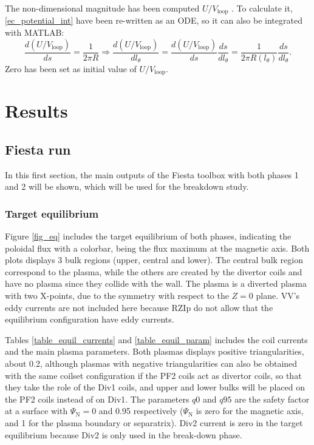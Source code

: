 \documentclass[a4paper,12pt,oneside]{book}
\begin{document}
The non-dimensional magnitude has been computed $U/V_\text{loop}$ \cite{Lazarus_1998}. To calculate it, \eqref{ec_potential_int} have been re-written as an ODE, so it can also be integrated with MATLAB:
%
\begin{equation}
\dfrac{d(U/V_\text{loop})}{ds}= \dfrac{1}{2 \pi R} \Rightarrow \dfrac{d(U/V_\text{loop})}{d l_\theta }=\dfrac{d(U/V_\text{loop})}{ds} \dfrac{ds}{d l_\theta}= \dfrac{1}{2 \pi R(l_\theta)} \dfrac{ds}{d l_\theta} .
\end{equation}
Zero has been set as initial value of $U/V_\text{loop}$.



\chapter{Results}
\label{sec_results}
\section{Fiesta run}

In this first section, the main outputs of the Fiesta toolbox with both phases 1 and 2 will be shown, which will be used for the breakdown study.

\subsection{Target equilibrium}

Figure \ref{fig_eq} includes the target equilibrium of both phases, indicating the poloidal flux with a colorbar, being the flux maximum at the magnetic axis. Both plots displays 3 bulk regions (upper, central and lower). The central bulk region correspond to the plasma, while the others are created by the divertor coils and have no plasma since they collide with the wall. The plasma is a diverted plasma with two X-points, due to the symmetry with respect to the $Z=0$ plane. VV's eddy currents are not included here because RZIp do not allow that the equilibrium configuration have eddy currents. 

Tables \ref{table_equil_currents} and \ref{table_equil_param} includes the coil currents and the main plasma parameters. Both plasmas displays positive triangularities, about 0.2, although plasmas with negative triangularities can also be obtained with the same coilset configuration if the PF2 coils act as divertor coils, so that they take the role of the Div1 coils, and upper and lower bulks will be placed on the PF2 coils instead of on Div1. The parameters $q0$ and $q95$ are the safety factor at a surface with $\Psi_\text{N}=$0 and 0.95 respectively ($\Psi_\text{N}$ is zero for the magnetic axis, and 1 for the plasma boundary or separatrix). Div2 current is zero in the target equilibrium because Div2 is only used in the break-down phase.
\end{document}

